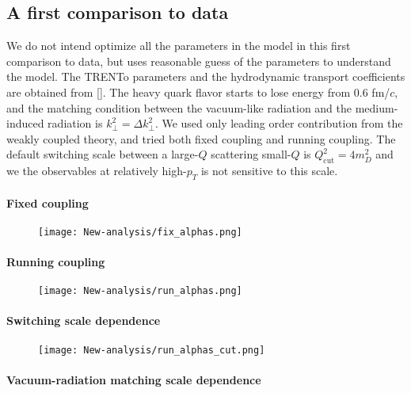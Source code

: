 \subsection{A first comparison to data}
We do not intend optimize all the parameters in the model in this first comparison to data, but uses reasonable guess of the parameters to understand the model.
The TRENTo parameters and the hydrodynamic transport coefficients are obtained from [].
The heavy quark flavor starts to lose energy from $0.6$ fm/$c$, and the matching condition between the vacuum-like radiation and the medium-induced radiation is $k_\perp^2 = \Delta k_\perp^2$.
We used only leading order contribution from the weakly coupled theory, and tried both fixed coupling and running coupling.
The default switching scale between a large-$Q$ scattering small-$Q$ is $Q_{\textrm{cut}}^2 = 4 m_D^2$ and we the observables at relatively high-$p_T$ is not sensitive to this scale.

\paragraph{Fixed coupling}
\begin{figure}
\centering
\texttt{[image: New-analysis/fix\_alphas.png]}
\caption{}
\label{fig:new:fix-a}
\end{figure}

\paragraph{Running coupling}
\begin{figure}
\centering
\texttt{[image: New-analysis/run\_alphas.png]}
\caption{}
\label{fig:new:run-a}
\end{figure}

\paragraph{Switching scale dependence}
\begin{figure}
\centering
\texttt{[image: New-analysis/run\_alphas\_cut.png]}
\caption{}
\label{fig:new:run-a}
\end{figure}

\paragraph{Vacuum-radiation matching scale dependence}
